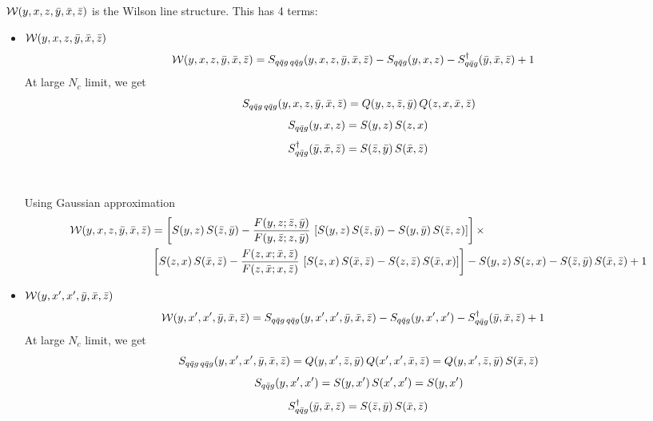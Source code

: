 \documentclass[9pt]{article}
\numberwithin{equation}{section}
\begin{document}
$\mathcal{W}(y,x,z,\Bar{y},\Bar{x},\Bar{z})$ is the Wilson line structure. This has 4 terms:
\begin{itemize}
    \item $\mathcal{W}(y,x,z,\Bar{y},\Bar{x},\Bar{z})$
    \begin{align}
        \mathcal{W}(y,x,z,\Bar{y},\Bar{x},\Bar{z}) & = S_{q\Bar{q}g\,q\Bar{q}g}(y,x,z,\Bar{y},\Bar{x},\Bar{z}) -S_{q\Bar{q}g}(y,x,z) - S^{\dagger}_{q\Bar{q}g}(\Bar{y},\Bar{x},\Bar{z}) + 1
    \end{align}
At large $N_{c}$ limit, we get
$$S_{q\Bar{q}g\,q\Bar{q}g}(y,x,z,\Bar{y},\Bar{x},\Bar{z}) = Q(y,z,\Bar{z},\Bar{y})\, Q(z,x,\Bar{x},\Bar{z})$$
$$S_{q\Bar{q}g}(y,x,z) = S(y,z)\, S(z,x)$$
$$S^{\dagger}_{q\Bar{q}g}(\Bar{y},\Bar{x},\Bar{z}) = S(\Bar{z},\Bar{y})\, S(\Bar{x},\Bar{z})$$
\\ \\ 
Using Gaussian approximation
\begin{align}
    \mathcal{W}(y,x,z,\Bar{y},\Bar{x},\Bar{z}) & = \left[S(y,z)\,S(\Bar{z},\Bar{y}) - \frac{F(y,z;\Bar{z},\Bar{y})}{F(y,\Bar{z};z,\Bar{y})}\, \left[S(y,z)\,S(\Bar{z},\Bar{y})-S(y,\Bar{y})\, S(\Bar{z},z)\right]\right]\times\notag \\ & \left[S(z,x)\,S(\Bar{x},\Bar{z}) - \frac{F(z,x;\Bar{x},\Bar{z})}{F(z,\Bar{x};x,\Bar{z})}\, \left[S(z,x)\,S(\Bar{x},\Bar{z})-S(z,\Bar{z})\, S(\Bar{x},x)\right]\right] - S(y,z)\, S(z,x) - S(\Bar{z},\Bar{y})\, S(\Bar{x},\Bar{z}) +1
\end{align}
\item $\mathcal{W}(y,x',x',\Bar{y},\Bar{x},\Bar{z})$
\begin{align}
        \mathcal{W}(y,x',x',\Bar{y},\Bar{x},\Bar{z}) & = S_{q\Bar{q}g\,q\Bar{q}g}(y,x',x',\Bar{y},\Bar{x},\Bar{z}) -S_{q\Bar{q}g}(y,x',x') - S^{\dagger}_{q\Bar{q}g}(\Bar{y},\Bar{x},\Bar{z}) + 1
    \end{align}
At large $N_{c}$ limit, we get
$$S_{q\Bar{q}g\,q\Bar{q}g}(y,x',x',\Bar{y},\Bar{x},\Bar{z}) = Q(y,x',\Bar{z},\Bar{y})\, Q(x',x',\Bar{x},\Bar{z}) = Q(y,x',\Bar{z},\Bar{y})\, S(\Bar{x},\Bar{z})$$
$$S_{q\Bar{q}g}(y,x',x') = S(y,x')\, S(x',x') = S(y,x') $$
$$S^{\dagger}_{q\Bar{q}g}(\Bar{y},\Bar{x},\Bar{z}) = S(\Bar{z},\Bar{y})\, S(\Bar{x},\Bar{z})$$
\\ \\ 

\end{itemize}
\end{document}

